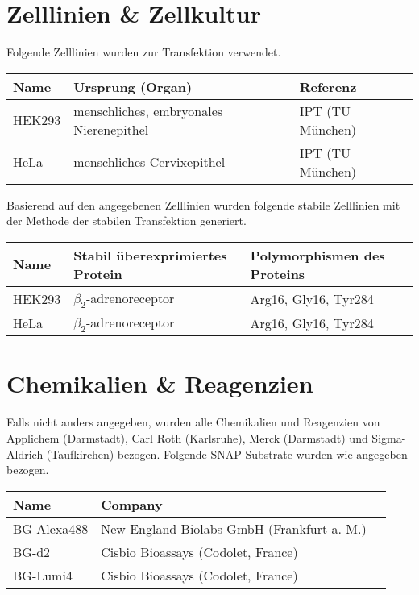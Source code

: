 \section{Zelllinien \& Zellkultur}
Folgende Zelllinien wurden zur Transfektion verwendet.
\begin{table}[htsp]
	\begin{tabular}{lll}
\toprule
Name		&	Ursprung (Organ)				&	Referenz\\
\midrule
HEK293		&	menschliches, embryonales Nierenepithel		&	IPT (TU München)\\
HeLa		&	menschliches Cervixepithel		&	IPT (TU München)\\
\bottomrule
\end {tabular}
\end{table}

Basierend auf den angegebenen Zelllinien wurden folgende stabile Zelllinien mit der Methode der stabilen Transfektion generiert.

\begin{table}[htsb]
\begin{tabular}{lll}
\toprule
Name		&	Stabil überexprimiertes Protein	&	Polymorphismen des Proteins\\
\midrule
HEK293		&	$\beta_2$-adrenoreceptor		&	Arg16, Gly16, Tyr284\\
HeLa		&	$\beta_2$-adrenoreceptor		&	Arg16, Gly16, Tyr284\\
\bottomrule
\end{tabular}
\end{table}

\section{Chemikalien \& Reagenzien}
Falls nicht anders angegeben, wurden alle Chemikalien und Reagenzien von Applichem (Darmstadt), Carl Roth (Karlsruhe), Merck (Darmstadt) und Sigma-Aldrich (Taufkirchen) bezogen. Folgende SNAP-Substrate wurden wie angegeben bezogen.

\begin{table}[htsb]
\begin{tabular}{lll}
\toprule
Name							&	Company\\
\midrule
BG-Alexa488						&	New England Biolabs GmbH (Frankfurt a. M.)\\
BG-d2							&	Cisbio Bioassays (Codolet, France)\\
BG-Lumi4						&	Cisbio Bioassays (Codolet, France)\\
\bottomrule
\end {tabular}
\end{table}


